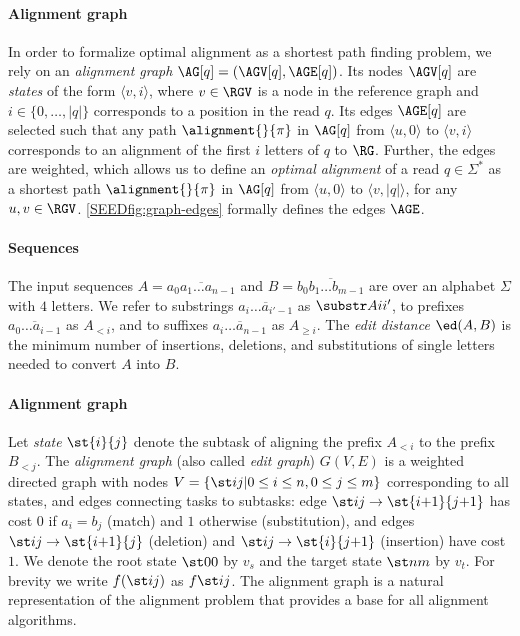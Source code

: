 \paragraph{Alignment graph}
%
In order to formalize optimal alignment as a shortest path finding problem, we
rely on an \emph{alignment graph} $\AG[q]=(\AGV[q],\AGE[q])$.
%
Its nodes $\AGV[q]$ are \emph{states} of the form $\langle v, i \rangle$, where
$v \in \RGV$ is a node in the reference graph and $i \in \{0, \dots, |q|\}$
corresponds to a position in the read $q$.
%
Its edges $\AGE[q]$ are selected such that any path $\alignment{}{\pi}$ in
$\AG[q]$ from $\langle u, 0 \rangle$ to $\langle v, i \rangle$ corresponds to an
alignment of the first $i$ letters of $q$ to $\RG$.
%
Further, the edges are weighted, which allows us to define an \emph{optimal
alignment} of a read $q \in \Sigma^*$ as a shortest path $\alignment{}{\pi}$ in
$\AG[q]$ from $\langle u, 0 \rangle$ to $\langle v, |q| \rangle$, for any $u, v
\in \RGV$.
%
\cref{SEEDfig:graph-edges} formally defines the edges $\AGE$.

\paragraph{Sequences}
The input sequences $A = \overline{a_0a_1\dots a_{n-1}}$ and $B =
\overline{b_0b_1 \dots b_{m-1}}$ are over an alphabet $\Sigma$ with $4$ letters.
We refer to substrings $\overline{a_i \dots a_{i'-1}}$ as $\substr Ai{i'}$, to
prefixes $\overline{a_0 \dots a_{i-1}}$ as $A_{<i}$, and to suffixes
$\overline{a_i \dots a_{n-1}}$ as $A_{\geq i}$. The \emph{edit distance}
$\ed(A,B)$ is the minimum number of insertions, deletions, and substitutions of
single letters needed to convert $A$ into $B$.

\paragraph{Alignment graph}
Let \emph{state} $\st{i}{j}$ denote the subtask of aligning the prefix $A_{<i}$
to the prefix $B_{<j}$. The \emph{alignment graph} (also called \emph{edit
graph}) $G(V,E)$ is a weighted directed graph with nodes $V = \{\st ij \vert
{0\leq i \leq n}, {0\leq j\leq m}\}$ corresponding to all states, and edges
connecting tasks to subtasks: edge ${\st ij \to \st{i{+}1}{j{+}1}}$ has cost $0$
if ${a_i = b_j}$ (match) and $1$ otherwise (substitution), and edges ${\st ij
\to \st{i{+}1}{j}}$ (deletion) and ${\st ij \to\st{i}{j{+}1}}$ (insertion) have
cost $1$. We denote the root state $\st 00$ by $v_s$ and the target state $\st
nm$ by $v_t$. For brevity we write $f(\st ij)$ as $f \st ij$. The alignment graph is
a natural representation of the alignment problem that provides a base for all
alignment algorithms.

